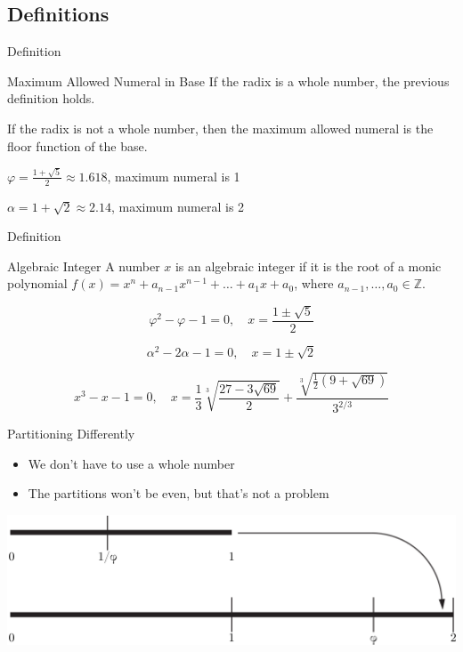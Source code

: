 \documentclass{beamer}
\begin{document}
\subsection{Definitions}
\begin{frame}{Definition}
  \begin{block}{Maximum Allowed Numeral in Base}
    If the radix is a whole number, the previous definition holds.

    If the radix is not a whole number, then the maximum allowed numeral is the floor function of the base.
  \end{block}\pause

  \begin{example}\pause
    $\varphi = \frac{1+\sqrt{5}}{2} \approx 1.618$, maximum numeral is 1 \pause

    $\alpha = 1+\sqrt{2} \approx 2.14$, maximum numeral is 2
  \end{example}
\end{frame}

\begin{frame}{Definition}
  \begin{block}{Algebraic Integer}
    A number $x$ is an algebraic integer if it is the root of a monic polynomial $f(x) = x^n + a_{n-1}x^{n-1}+\dots+a_1x+a_0$, where $a_{n-1},\dots,a_0\in\mathbb{Z}$.
  \end{block}

  \begin{example}\pause
    $$\varphi^2 -\varphi - 1 = 0, \quad x=\frac{1\pm\sqrt{5}}{2}$$\pause

    $$\alpha^2 - 2\alpha - 1 = 0, \quad x = 1\pm\sqrt{2}$$\pause

    $$x^3 -x - 1 = 0, \quad x=\frac{1}{3}\sqrt[3]{\frac{27-3\sqrt{69}}{2}} + \frac{\sqrt[3]{\frac{1}{2}(9 + \sqrt{69})}}{3^{2/3}}$$
  \end{example}
\end{frame}



\begin{frame}{Partitioning Differently}
  \begin{itemize}
    \item We don't have to use a whole number \pause
    \item The partitions won't be even, but that's not a problem \pause
  \end{itemize}
  \includegraphics[width=\textwidth]{images/partitioning/partitioningbeta}
\end{frame}
\end{document}
